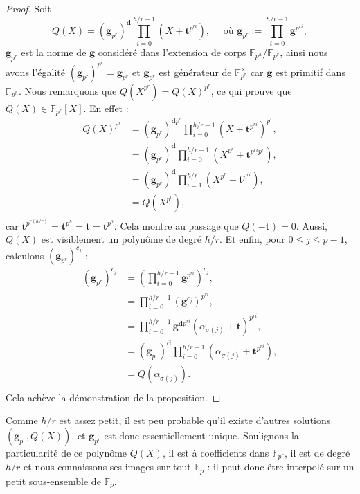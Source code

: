 \documentclass[a4paper, titlepage, 11pt]{article}
\theoremstyle{definition}
\theoremstyle{remark}
\def\gf #1{\mathbb{F}_{#1}}
\def\mbf #1{\mathbf{#1}}
\newcommand{\extension}[2]{{#1} / {#2}} %
\begin{document}
\begin{proof}
Soit
$$Q(X) = (\mbf g_{p^r})^{\mbf d} \prod_{i=0}^{h/r-1} \left(X+\mbf t^{p^{ri}}\right),
\quad \text{ où } \mbf g_{p^r} := \prod_{i=0}^{h/r-1} \mbf g^{p^{ri}},$$
$\mbf g_{p^r}$ est la norme de $\mbf g$ considéré dans l'extension de corps $\extension{\gf{p^h}}{\gf{p^r}}$, ainsi nous avons l'égalité $(\mbf g_{p^r})^{p^r} = \mbf g_{p^r}$ et $\mbf g_{p^r}$ est générateur de $\gf{p^r}^\times$ car $\mbf g$ est primitif dans $\gf{p^h}$. Nous remarquons que $Q\left(X^{p^r}\right) = Q(X)^{p^r}$, ce qui prouve que $Q(X) \in \gf{p^r}[X]$. En effet :
\begin{align*}
Q\left(X\right)^{p^r} &= (\mbf g_{p^r})^{\mbf dp^r} \prod_{i=0}^{h/r-1} \left(X+\mbf t^{p^{ri}}\right)^{p^r}, \\
&= (\mbf g_{p^r})^{\mbf d} \prod_{i=0}^{h/r-1} \left(X^{p^r} + \mbf t^{p^{ri}p^r}\right), \\
&= (\mbf g_{p^r})^{\mbf d} \prod_{i=1}^{h/r} \left(X^{p^r} + \mbf t^{p^{ri}}\right), \\
&= Q\left(X^{p^r}\right), \\
\end{align*}
car $\mbf t^{p^{r(h/r)}} = \mbf t^{p^h} = \mbf t = \mbf t^{p^0}$. Cela montre au passage que $Q(-\mbf t) = 0$. Aussi, $Q(X)$ est visiblement un polynôme de degré $h/r$. Et enfin, pour $0\leqslant j \leqslant p-1$, calculons $(\mbf g_{p^r})^{c_j}$ :
\begin{align*}
(\mbf g_{p^r})^{c_j} &= \left(\prod_{i=0}^{h/r-1} \mbf g^{p^{ri}}\right)^{c_j},\\
&= \prod_{i=0}^{h/r-1} \left(\mbf g^{c_j}\right)^{p^{ri}}, \\
&= \prod_{i=0}^{h/r-1} \mbf g^{\mbf dp^{ri}}\left(\alpha_{\sigma(j)} + \mbf t\right)^{p^{ri}},\\
&= (\mbf g_{p^r})^{\mbf d} \prod_{i=0}^{h/r-1} \left(\alpha_{\sigma(j)} + \mbf t^{p^{ri}}\right),\\
&= Q\left(\alpha_{\sigma(j)}\right). \\
\end{align*}
Cela achève la démonstration de la proposition.
\end{proof}

Comme $h/r$ est assez petit, il est peu probable qu'il existe d'autres solutions $(\mbf g_{p^r}, Q(X))$, et $\mbf g_{p^r}$ est donc essentiellement unique. Soulignons la particularité de ce polynôme $Q(X)$, il est à coefficients dans $\gf{p^r}$, il est de degré $h/r$ et nous connaissons ses images sur tout $\gf{p}$ : il peut donc être interpolé sur un petit sous-ensemble de $\gf{p}$.
\end{document}
